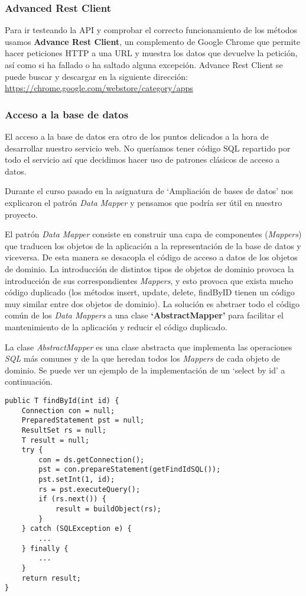 \subsubsection{Advanced Rest Client}
Para ir testeando la API y comprobar el correcto funcionamiento de los métodos usamos \textbf{Advance Rest Client}, un complemento de Google Chrome que permite hacer peticiones HTTP a una URL y muestra los datos que devuelve la petición, así como si ha fallado o ha saltado alguna excepción. Advance Rest Client se puede buscar y descargar en la siguiente dirección:
 \url{https://chrome.google.com/webstore/category/apps} 
 
\subsubsection{Acceso a la base de datos}

El acceso a la base de datos era otro de los puntos delicados a la hora de desarrollar nuestro servicio web. No queríamos tener código SQL repartido por todo el servicio así que decidimos hacer uso de patrones clásicos de acceso a datos.

Durante el curso pasado en la asignatura de `Ampliación de bases de datos' nos explicaron el patrón \textit{Data Mapper} y pensamos que podría ser útil en nuestro proyecto.

\vspace{1em}

El patrón \textit{Data Mapper} consiste en construir una capa de componentes (\textit{Mappers}) que traducen los objetos de la aplicación a la representación de la base de datos y viceversa. De esta manera se desacopla el código de acceso a datos de los objetos de dominio.
La introducción de distintos tipos de objetos de dominio provoca la introducción de sus correspondientes \textit{Mappers}, y esto provoca que exista mucho código duplicado (los métodos insert, update, delete, findByID tienen un código muy similar entre dos objetos de dominio). La solución es abstraer todo el código común de los \textit{Data Mappers} a una clase \textbf{`AbstractMapper'} para facilitar el mantenimiento de la aplicación y reducir el código duplicado.

La clase \textit{AbstractMapper} es una clase abstracta que implementa las operaciones \textit{SQL} más comunes y de la que heredan todos los \textit{Mappers} de cada objeto de dominio. Se puede ver un ejemplo de la implementación de un `select by id' a continuación.

\vspace{1em}
{\codesize
\lstset{}
\begin{lstlisting}[frame=single]
public T findById(int id) {
	Connection con = null;
	PreparedStatement pst = null;
	ResultSet rs = null;
	T result = null;
	try {
		con = ds.getConnection();
		pst = con.prepareStatement(getFindIdSQL());
		pst.setInt(1, id);
		rs = pst.executeQuery();
		if (rs.next()) {
			result = buildObject(rs);
		} 
	} catch (SQLException e) {
		... 
	} finally {
		... 
	}
	return result;
}
\end{lstlisting}
}
\vspace{1em}

